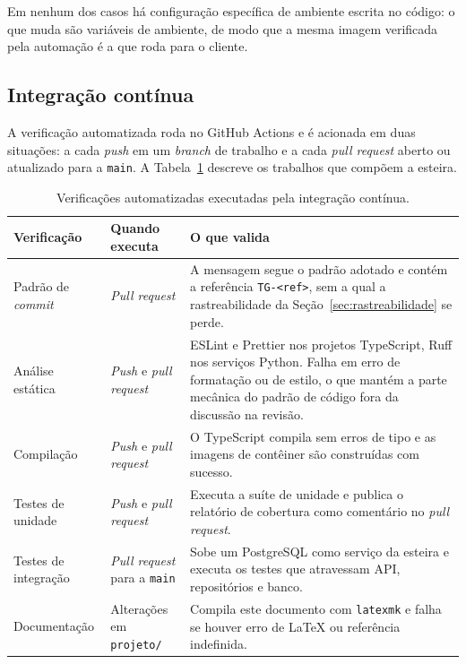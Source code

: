 \documentclass[a4paper,12pt,oneside,openany]{book}
\begin{document}
Em nenhum dos casos há configuração específica de ambiente escrita no código: o
que muda são variáveis de ambiente, de modo que a mesma imagem verificada pela
automação é a que roda para o cliente.

\subsection{Integração contínua}

A verificação automatizada roda no GitHub Actions e é acionada em duas
situações: a cada \textit{push} em um \textit{branch} de trabalho e a cada
\textit{pull request} aberto ou atualizado para a \texttt{main}. A
Tabela~\ref{tab:ci} descreve os trabalhos que compõem a esteira.

\begin{table}[H]
\centering
\caption{Verificações automatizadas executadas pela integração contínua.}
\label{tab:ci}
\begin{tabularx}{0.95\textwidth}{p{} p{} X}
\toprule
\textbf{Verificação} & \textbf{Quando executa} & \textbf{O que valida} \\
\midrule
Padrão de \textit{commit} & \textit{Pull request} & A mensagem segue o padrão
adotado e contém a referência \texttt{TG-<ref>}, sem a qual a rastreabilidade
da Seção~\ref{sec:rastreabilidade} se perde. \\
Análise estática & \textit{Push} e \textit{pull request} & ESLint e Prettier
nos projetos TypeScript, Ruff nos serviços Python. Falha em erro de formatação
ou de estilo, o que mantém a parte mecânica do padrão de código fora da
discussão na revisão. \\
Compilação & \textit{Push} e \textit{pull request} & O TypeScript compila sem
erros de tipo e as imagens de contêiner são construídas com sucesso. \\
Testes de unidade & \textit{Push} e \textit{pull request} & Executa a suíte de
unidade e publica o relatório de cobertura como comentário no \textit{pull
request}. \\
Testes de integração & \textit{Pull request} para a \texttt{main} & Sobe um
PostgreSQL como serviço da esteira e executa os testes que atravessam API,
repositórios e banco. \\
Documentação & Alterações em \texttt{projeto/} & Compila este documento com
\texttt{latexmk} e falha se houver erro de \LaTeX{} ou referência indefinida. \\
\bottomrule
\end{tabularx}
\end{table}
\end{document}
